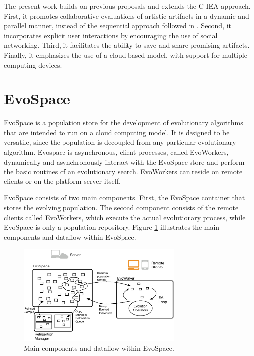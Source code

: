 \documentclass{llncs}
\begin{document}
The present work builds on previous proposals and extends the C-IEA approach.
First, it promotes collaborative evaluations of artistic artifacts in a dynamic and parallel manner,
instead of the sequential approach followed in \cite{picbreeder,forms}.
Second, it incorporates explicit user interactions by encouraging the use of social networking.
Third, it facilitates the ability to save and share promising artifacts.
Finally, it emphasizes the use of a cloud-based model, with support for multiple computing devices.


\section{EvoSpace}
\label{sec:evospace}
EvoSpace is a population store for the development of evolutionary algorithms that are intended to run on a cloud computing model.
It is designed to be versatile, since the population is decoupled from any particular evolutionary algorithm.
Evospace is asynchronous, client processes, called EvoWorkers, dynamically and asynchronously interact with the EvoSpace store and perform the basic
routines of an evolutionary search.
EvoWorkers can reside on remote clients or on the platform server itself.

EvoSpace consists of two main components.
First, the EvoSpace container that stores the evolving population.
The second component consists of the remote clients called EvoWorkers, which
execute the actual evolutionary process, while EvoSpace is only a population repository.
Figure \ref{fig:evo} illustrates the main components and dataflow within EvoSpace.

\begin{figure}[t]
    \centering
        \includegraphics[width=8cm]{evospaceExample.eps}
    \caption{Main components and dataflow within EvoSpace.}
    \label{fig:evo}
\end{figure}
\end{document}
